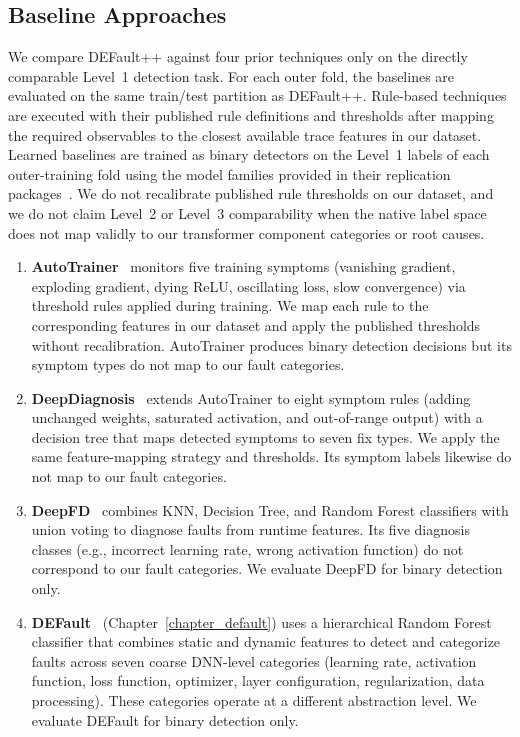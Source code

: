 \subsection{Baseline Approaches}

We compare DEFault++ against four prior techniques only on the directly comparable Level~1 detection task. For each outer fold, the baselines are evaluated on the same train/test partition as DEFault++. Rule-based techniques are executed with their published rule definitions and thresholds after mapping the required observables to the closest available trace features in our dataset. Learned baselines are trained as binary detectors on the Level~1 labels of each outer-training fold using the model families provided in their replication packages~\cite{autotrainer,deepdiagnosis,deepfd,default}. We do not recalibrate published rule thresholds on our dataset, and we do not claim Level~2 or Level~3 comparability when the native label space does not map validly to our transformer component categories or root causes.

\begin{enumerate}[label=(\roman*),nosep]
\item \textbf{AutoTrainer}~\cite{autotrainer} monitors five training symptoms (vanishing gradient, exploding gradient, dying ReLU, oscillating loss, slow convergence) via threshold rules applied during training. We map each rule to the corresponding features in our dataset and apply the published thresholds without recalibration. AutoTrainer produces binary detection decisions but its symptom types do not map to our fault categories.

\item \textbf{DeepDiagnosis}~\cite{deepdiagnosis} extends AutoTrainer to eight symptom rules (adding unchanged weights, saturated activation, and out-of-range output) with a decision tree that maps detected symptoms to seven fix types. We apply the same feature-mapping strategy and thresholds. Its symptom labels likewise do not map to our fault categories.

\item \textbf{DeepFD}~\cite{deepfd} combines KNN, Decision Tree, and Random Forest classifiers with union voting to diagnose faults from runtime features. Its five diagnosis classes (e.g., incorrect learning rate, wrong activation function) do not correspond to our fault categories. We evaluate DeepFD for binary detection only.

\item \textbf{DEFault}~\cite{default} (Chapter~\ref{chapter_default}) uses a hierarchical Random Forest classifier that combines static and dynamic features to detect and categorize faults across seven coarse DNN-level categories (learning rate, activation function, loss function, optimizer, layer configuration, regularization, data processing). These categories operate at a different abstraction level. We evaluate DEFault for binary detection only.
\end{enumerate}

